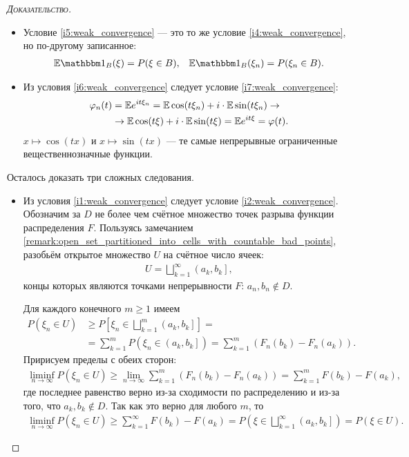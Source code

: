 \documentclass[../main.tex]{subfiles}
\begin{document}
\begin{proof}[\normalfont\textsc{Доказательство}]
\begin{itemize}
  \item Условие \ref{i5:weak_convergence} --- это то же условие \ref{i4:weak_convergence}, но по-другому записанное:
   \begin{align*}
    \E \Ind_B (\xi) = P(\xi \in B), && \E \Ind_B(\xi_n) = P(\xi_n \in B).
   \end{align*}

  \item Из условия \ref{i6:weak_convergence} следует условие \ref{i7:weak_convergence}:
   \begin{align*}
    \varphi_n(t) &= \mathbb E e^{it\xi_n} = \mathbb E \cos(t\xi_n) + i \cdot \mathbb E\sin(t\xi_n) \to \\
    &\to \mathbb E \cos(t\xi) + i \cdot \mathbb E\sin(t\xi) = \mathbb E e^{it\xi} = \varphi(t).
   \end{align*} $ x \mapsto \cos(tx) $ и $ x \mapsto \sin(tx) $ --- те самые непрерывные ограниченные вещественнозначные функции.
 \end{itemize}

 Осталось доказать три сложных следования.

 \begin{itemize}
  \item Из условия \ref{i1:weak_convergence} следует условие \ref{i2:weak_convergence}. Обозначим за $ D $ не более чем счётное множество точек разрыва функции распределения $ F $. Пользуясь замечанием  \ref{remark:open_set_partitioned_into_cells_with_countable_bad_points}, разобьём открытое множество $ U $ на счётное число ячеек:
   \begin{align*}
    U = \bigsqcup_{k=1}^{\infty} \left(a_k, b_k\right],
   \end{align*} концы которых являются точками непрерывности $ F $: $ a_n, b_n \notin D $.

   Для каждого конечного  $ m \geqslant 1 $  имеем
   \begin{align*}
    P(\xi_n \in U) &\geqslant P \left[ \xi_n\in \bigsqcup_{k=1}^{m} \left(a_k, b_k\right]   \right] = \\
    &= \sum_{k=1}^{m} P(\xi_n \in \left(a_k, b_k\right]  ) = \sum_{k=1}^{m} (F_n(b_k) - F_n(a_k)).
   \end{align*} Пририсуем пределы с обеих сторон:
   \begin{align*}
    \liminf_{n \to \infty} P(\xi_n \in U) \geqslant \lim_{n \to \infty} \sum_{k=1}^{m}(F_n(b_k) - F_n(a_k)) = \sum_{k=1}^{m} F(b_k)-F(a_k),
   \end{align*} где последнее равенство верно из-за сходимости по распределению и из-за того, что $ a_k,b_k \notin D $. Так как это верно для любого $ m $, то
   \begin{align*}
    \liminf_{n \to \infty} P(\xi_n\in U) \geqslant \sum_{k=1}^{\infty}F(b_k)-F(a_k) = P \left( \xi \in \bigsqcup_{k=1}^{\infty} \left(a_k, b_k\right]   \right) = P(\xi\in U).
   \end{align*}


\end{itemize}
\end{proof}
\end{document}
